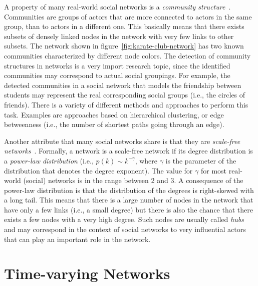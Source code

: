 A property of many real-world social networks is a \emph{community structure}~\cite{Girvan2002}.
Communities are groups of actors that are more connected to actors in the same group, than to actors in a different one.
This basically means that there exists subsets of densely linked nodes in the network with very few links to other subsets.
The network shown in figure~\ref{fig:karate-club-network} has two known communities characterized by different node colors.
The detection of community structures in networks is a very import research topic, since the identified communities may correspond to actual social groupings.
For example, the detected communities in a social network that models the friendship between students may represent the real corresponding social groups (i.e., the circles of friends).
There is a variety of different methods and approaches to perform this task.
Examples are approaches based on hierarchical clustering, or edge betweenness (i.e., the number of shortest paths going through an edge).

Another attribute that many social networks share is that they are \emph{scale-free networks}~\cite{Barabasi2016}.
Formally, a network is a scale-free network if its degree distribution is a \emph{power-law distribution} (i.e., \(p(k) \sim k^{-\gamma}\), where \(\gamma\) is the parameter of the distribution that denotes the degree exponent).
The value for \(\gamma\) for most real-world (social) networks is in the range between 2 and 3.
A consequence of the power-law distribution is that the distribution of the degrees is right-skewed with a long tail.
This means that there is a large number of nodes in the network that have only a few links (i.e., a small degree) but there is also the chance that there exists a few nodes with a very high degree.
Such nodes are usually called \emph{hubs} and may correspond in the context of social networks to very influential actors that can play an important role in the network.




\section{Time-varying Networks}
\label{sec:time-varying-networks}

